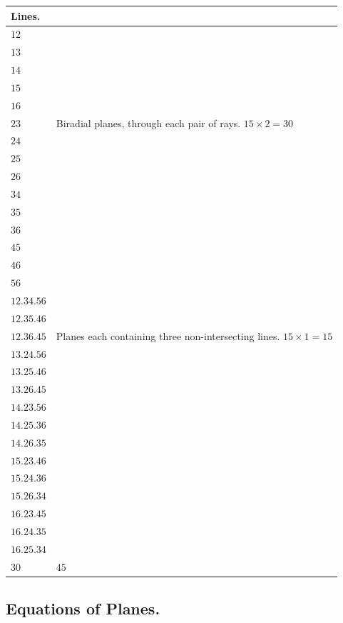 \documentclass[11pt,a4paper]{article}
\begin{document}
\begin{center}
\begin{tabular}{ll}
\textbf{Lines.} & \\
\midrule
$12$ & \\
$13$ & \\
$14$ & \\
$15$ & \\
$16$ & \\
$23$ & Biradial planes, through each pair of rays. $15 \times 2 = 30$ \\
$24$ & \\
$25$ & \\
$26$ & \\
$34$ & \\
$35$ & \\
$36$ & \\
$45$ & \\
$46$ & \\
$56$ & \\
$12.34.56$ & \\
$12.35.46$ & \\
$12.36.45$ & Planes each containing three non-intersecting lines. $15 \times 1 = 15$ \\
$13.24.56$ & \\
$13.25.46$ & \\
$13.26.45$ & \\
$14.23.56$ & \\
$14.25.36$ & \\
$14.26.35$ & \\
$15.23.46$ & \\
$15.24.36$ & \\
$15.26.34$ & \\
$16.23.45$ & \\
$16.24.35$ & \\
$16.25.34$ & \\
$30$ & $45$
\end{tabular}
\end{center}

\subsection*{Equations of Planes.}
\end{document}
